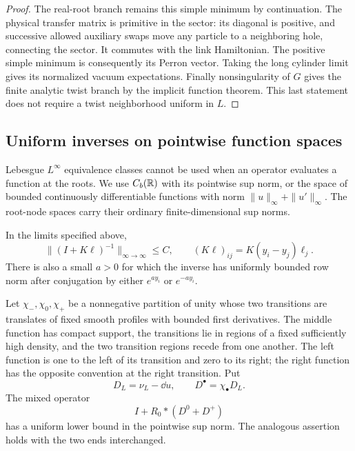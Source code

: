 \begin{proof}
The real-root branch remains this simple minimum by continuation.
The physical transfer matrix is primitive in the sector: its
diagonal is positive, and successive allowed auxiliary swaps move
any particle to a neighboring hole, connecting the sector.
It commutes with the link Hamiltonian.  The positive simple
minimum is consequently its Perron vector.  Taking the long
cylinder limit gives its normalized vacuum expectations.
Finally nonsingularity of $G$ gives the finite analytic twist
branch by the implicit function theorem.  This last statement
does not require a twist neighborhood uniform in $L$.
\end{proof}


\subsection{Uniform inverses on pointwise function spaces}

Lebesgue $L^\infty$ equivalence classes cannot be used when an
operator evaluates a function at the roots.  We use $C_b(\mathbb R)$
with its pointwise sup norm, or the space of bounded continuously
differentiable functions with norm
$\|u\|_\infty+\|u'\|_\infty$.  The root-node spaces carry their
ordinary finite-dimensional sup norms.

\begin{lemma}
\label{lem:gaudin-inverse}
In the limits specified above,
\begin{equation}\label{eq:Gaudin-sup-inverse}
 \|(I+K\ell)^{-1}\|_{\infty\to\infty}\le C,\qquad
 (K\ell)_{ij}=K(y_i-y_j)\ell_j.
\end{equation}
There is also a small $a>0$ for which the inverse has uniformly
bounded row norm after conjugation by either $e^{ay_i}$ or
$e^{-ay_i}$.

Let $\chi_-,\chi_0,\chi_+$ be a nonnegative partition of unity
whose two transitions are translates of fixed smooth profiles
with bounded first derivatives.  The middle function has compact
support, the transitions lie in regions of a fixed sufficiently
high density, and the two transition regions recede from one
another.  The left function is one to the left of its transition
and zero to its right; the right function has the opposite
convention at the right transition.  Put
\[
 D_L=\nu_L-\dd u,\qquad D^\bullet=\chi_\bullet D_L.
\]
The mixed operator
\begin{equation}\label{eq:mixed-operator}
 I+R_0*(D^0+D^+)
\end{equation}
has a uniform lower bound in the pointwise sup norm.
The analogous assertion holds with the two ends interchanged.
\end{lemma}

